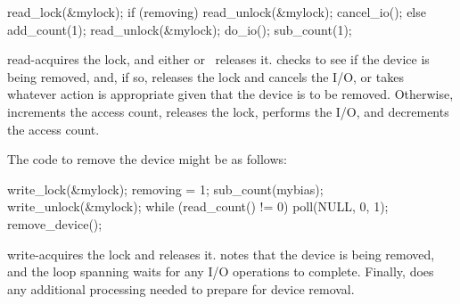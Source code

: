 \begin{fcvlabel}
\begin{VerbatimN}[commandchars=\\\[\]]
read_lock(&mylock);		\lnlbl[acq]
if (removing) {			\lnlbl[check]
	read_unlock(&mylock);	\lnlbl[rel1]
	cancel_io();		\lnlbl[cancel]
} else {
	add_count(1);		\lnlbl[inc]
	read_unlock(&mylock);	\lnlbl[rel2]
	do_io();		\lnlbl[do]
	sub_count(1);		\lnlbl[dec]
}
\end{VerbatimN}
\end{fcvlabel}

\begin{fcvref}
 read-acquires the lock, and either
 or~ releases it.
 checks to see if the device is being removed, and, if so,
 releases the lock and
 cancels the I/O, or takes whatever
action is appropriate given that the device is to be removed.
Otherwise,  increments the access count,
 releases the
lock,  performs the I/O, and
 decrements the access count.
\end{fcvref}

\QuickQuizEnd

The code to remove the device might be as follows:

\begin{fcvlabel}
\begin{VerbatimN}[commandchars=\\\[\]]
write_lock(&mylock);		\lnlbl[acq]
removing = 1;			\lnlbl[note]
sub_count(mybias);
write_unlock(&mylock);		\lnlbl[rel]
while (read_count() != 0)	\lnlbl[loop:b]
	poll(NULL, 0, 1);	\lnlbl[loop:e]
remove_device();		\lnlbl[remove]
\end{VerbatimN}
\end{fcvlabel}

\begin{fcvref}
 write-acquires the lock and
 releases it.
 notes that the device is being removed, and the loop spanning
 waits for any I/O operations to complete.
Finally,  does any additional processing needed to prepare for
device removal.
\end{fcvref}

